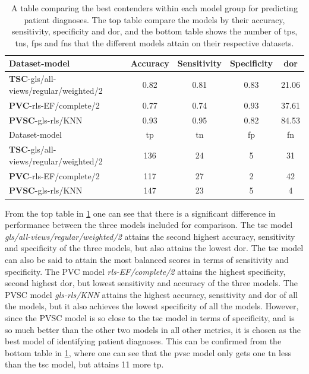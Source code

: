 \begin{table}
    \centering
    \begin{tabular}{lcccc}
        \toprule
        Dataset-model                                 &  Accuracy &  Sensitivity &  Specificity &  \acrshort{dor} \\
        \midrule
        \textbf{TSC}-gls/all-views/regular/weighted/2 &      0.82 &         0.81 &         0.83 & 21.06 \\
        \textbf{PVC}-rls-EF/complete/2                &      0.77 &         0.74 &         0.93 & 37.61 \\
        \textbf{PVSC}-gls-rls/KNN                     &      0.93 &         0.95 &         0.82 & 84.53 \\
        \midrule
        Dataset-model                                 &  \acrshort{tp} &  \acrshort{tn} &  \acrshort{fp} &  \acrshort{fn} \\
        \midrule
        \textbf{TSC}-gls/all-views/regular/weighted/2 & 136 &  24 &   5 &  31 \\
        \textbf{PVC}-rls-EF/complete/2                & 117 &  27 &   2 &  42 \\
        \textbf{PVSC}-gls-rls/KNN                     & 147 &  23 &  5  &   4 \\
        \bottomrule
    \end{tabular}
    \caption{A table comparing the best contenders within each model group for predicting patient diagnoses. 
             The top table compare the models by their accuracy, sensitivity, specificity and \acrshort{dor}, 
             and the bottom table shows the number of \acrshort{tp}s, \acrshort{tn}s, \acrshort{fp}s and \acrshort{fn}s that the different models attain on their respective datasets.}
    \label{tab:pd_compare}
\end{table}

From the top table in \ref{tab:pd_compare} one can see that there is a significant difference in performance between the three models included for comparison.
The \acrshort{tsc} model \textit{gls/all-views/regular/weighted/2} attains the second highest accuracy, sensitivity and specificity of the three models, but also attains the lowest \acrshort{dor}.
The \acrshort{tsc} model can also be said to attain the most balanced scores in terms of sensitivity and specificity. 
The PVC model \textit{rls-EF/complete/2} attains the highest specificity, second highest \acrshort{dor}, but lowest sensitivity and accuracy of the three models. 
The PVSC model \textit{gls-rls/KNN} attains the highest accuracy, sensitivity and \acrshort{dor} of all the models, but it also achieves the lowest specificity of all the models. 
However, since the PVSC model is so close to the \acrshort{tsc} model in terms of specificity, and is so much better than the other two models in all other metrics, it is chosen as the best model of 
identifying patient diagnoses.
This can be confirmed from the bottom table in \ref{tab:pd_compare}, where one can see that the \acrshort{pvsc} model only gets one \acrshort{tn} less than the \acrshort{tsc} model, but attains 11 more \acrshort{tp}. 

